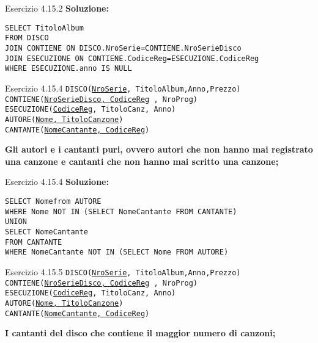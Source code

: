 \begin{frame}{Esercizio 4.15.2}
    \textbf{Soluzione:}
    \vspace{1em}
    
    \texttt{SELECT TitoloAlbum\\FROM DISCO\\JOIN CONTIENE ON DISCO.NroSerie=CONTIENE.NroSerieDisco
\\JOIN ESECUZIONE ON
CONTIENE.CodiceReg=ESECUZIONE.CodiceReg \\WHERE ESECUZIONE.anno IS NULL}
    \end{frame}
\begin{frame}{Esercizio 4.15.4}
    \texttt{DISCO(\underline{NroSerie}, TitoloAlbum,Anno,Prezzo)\\
    CONTIENE(\underline{NroSerieDisco, CodiceReg} , NroProg)\\
    ESECUZIONE(\underline{CodiceReg}, TitoloCanz, Anno)\\
    AUTORE(\underline{Nome, TitoloCanzone})\\
    CANTANTE(\underline{NomeCantante, CodiceReg})}
    \vspace{1em}
    
    \textbf{Gli autori e i cantanti puri, ovvero autori che non hanno mai registrato una canzone e cantanti che non hanno mai scritto una canzone;}
\end{frame}

\begin{frame}{Esercizio 4.15.4}
    \textbf{Soluzione:}
    \vspace{1em}
    
    \texttt{SELECT Nomefrom AUTORE\\WHERE Nome NOT IN (SELECT NomeCantante
FROM CANTANTE)\\
UNION\\
SELECT NomeCantante\\FROM CANTANTE\\WHERE NomeCantante NOT IN (SELECT Nome FROM AUTORE)}
    \end{frame}
\begin{frame}{Esercizio 4.15.5}
    \texttt{DISCO(\underline{NroSerie}, TitoloAlbum,Anno,Prezzo)\\
    CONTIENE(\underline{NroSerieDisco, CodiceReg} , NroProg)\\
    ESECUZIONE(\underline{CodiceReg}, TitoloCanz, Anno)\\
    AUTORE(\underline{Nome, TitoloCanzone})\\
    CANTANTE(\underline{NomeCantante, CodiceReg})}
    \vspace{1em}
    
    \textbf{I cantanti del disco che contiene il maggior numero di canzoni;}
\end{frame}

